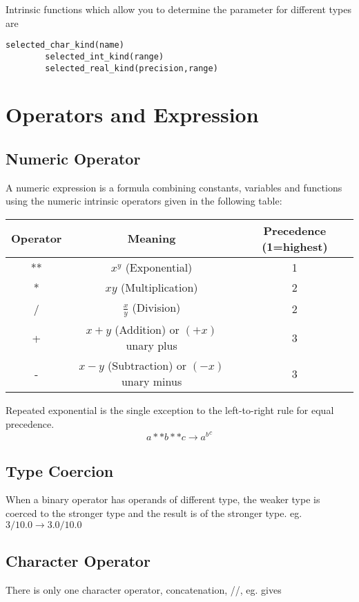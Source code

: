 \documentclass[class=book,crop=false]{standalone}
\begin{document}
    Intrinsic functions which allow you to determine the  parameter for different types are
    \begin{lstlisting}[numbers=none]
        selected_char_kind(name)
        selected_int_kind(range)
        selected_real_kind(precision,range)
    \end{lstlisting}
    \section{Operators and Expression}
    \subsection{Numeric Operator}
    A numeric expression is a formula combining constants, variables and functions using the numeric intrinsic operators given in the following table:
    \begin{table}[h!]
        \centering
        \begin{tabular}{|c|c|c|}
            \hline
            Operator & Meaning & Precedence (1=highest)\\\hline
            ** & $ x^y $ (Exponential) & 1\\\hline
            * & $ xy  $ (Multiplication)& 2\\\hline
            / & $ \frac{\displaystyle x}{\displaystyle y}  $ (Division)& 2\\\hline
            + & $ x+y  $ (Addition) or $ (+x) $ unary plus & 3\\\hline
            - & $ x-y  $ (Subtraction) or $ (-x) $ unary minus & 3\\\hline
        \end{tabular}
    \end{table}
    Repeated exponential is the single exception to the left-to-right rule for equal precedence.
    \[a**b**c\to {a^b}^c\]
    \subsection{Type Coercion}
    When a binary operator has operands of different type, the weaker type is coerced to the stronger type and the result is of the stronger type. eg. $ 3/10.0 \to 3.0/10.0 $
    \subsection{Character Operator}
    There is only one character operator, concatenation, //, eg.  gives 
\end{document}

